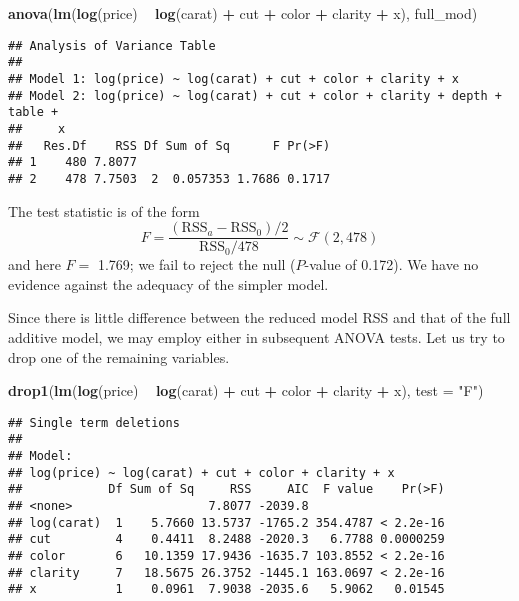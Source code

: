 \documentclass[]{book}
\newenvironment{Shaded}{\begin{snugshade}}{\end{snugshade}}
\newcommand{\DataTypeTok}[1]{\textcolor[rgb]{0.13,0.29,0.53}{#1}}
\newcommand{\KeywordTok}[1]{\textcolor[rgb]{0.13,0.29,0.53}{\textbf{#1}}}
\newcommand{\NormalTok}[1]{#1}
\newcommand{\OperatorTok}[1]{\textcolor[rgb]{0.81,0.36,0.00}{\textbf{#1}}}
\newcommand{\StringTok}[1]{\textcolor[rgb]{0.31,0.60,0.02}{#1}}
\theoremstyle{definition}
\theoremstyle{definition}
\theoremstyle{definition}
\theoremstyle{remark}
\begin{document}
\begin{Shaded}
\begin{Highlighting}[]
\KeywordTok{anova}\NormalTok{(}\KeywordTok{lm}\NormalTok{(}\KeywordTok{log}\NormalTok{(price) }\OperatorTok{~}\StringTok{ }\KeywordTok{log}\NormalTok{(carat) }\OperatorTok{+}\StringTok{ }\NormalTok{cut }\OperatorTok{+}\StringTok{ }\NormalTok{color }\OperatorTok{+}\StringTok{ }\NormalTok{clarity }\OperatorTok{+}\StringTok{ }\NormalTok{x), full_mod)}
\end{Highlighting}
\end{Shaded}

\begin{verbatim}
## Analysis of Variance Table
## 
## Model 1: log(price) ~ log(carat) + cut + color + clarity + x
## Model 2: log(price) ~ log(carat) + cut + color + clarity + depth + table + 
##     x
##   Res.Df    RSS Df Sum of Sq      F Pr(>F)
## 1    480 7.8077                           
## 2    478 7.7503  2  0.057353 1.7686 0.1717
\end{verbatim}

The test statistic is of the form
\[F = \frac{(\mathrm{RSS}_a-\mathrm{RSS}_0)/2}{\mathrm{RSS}_0/478}\sim \mathcal{F}(2, 478)\]
and here \(F=\) 1.769; we fail to reject the null (\(P\)-value of
0.172). We have no evidence against the adequacy of the simpler model.

Since there is little difference between the reduced model RSS and that
of the full additive model, we may employ either in subsequent ANOVA
tests. Let us try to drop one of the remaining variables.

\begin{Shaded}
\begin{Highlighting}[]
\KeywordTok{drop1}\NormalTok{(}\KeywordTok{lm}\NormalTok{(}\KeywordTok{log}\NormalTok{(price) }\OperatorTok{~}\StringTok{ }\KeywordTok{log}\NormalTok{(carat) }\OperatorTok{+}\StringTok{ }\NormalTok{cut }\OperatorTok{+}\StringTok{ }\NormalTok{color }\OperatorTok{+}\StringTok{ }\NormalTok{clarity }\OperatorTok{+}\StringTok{ }\NormalTok{x), }\DataTypeTok{test =} \StringTok{"F"}\NormalTok{)}
\end{Highlighting}
\end{Shaded}

\begin{verbatim}
## Single term deletions
## 
## Model:
## log(price) ~ log(carat) + cut + color + clarity + x
##            Df Sum of Sq     RSS     AIC  F value    Pr(>F)
## <none>                   7.8077 -2039.8                   
## log(carat)  1    5.7660 13.5737 -1765.2 354.4787 < 2.2e-16
## cut         4    0.4411  8.2488 -2020.3   6.7788 0.0000259
## color       6   10.1359 17.9436 -1635.7 103.8552 < 2.2e-16
## clarity     7   18.5675 26.3752 -1445.1 163.0697 < 2.2e-16
## x           1    0.0961  7.9038 -2035.6   5.9062   0.01545
\end{verbatim}
\end{document}
